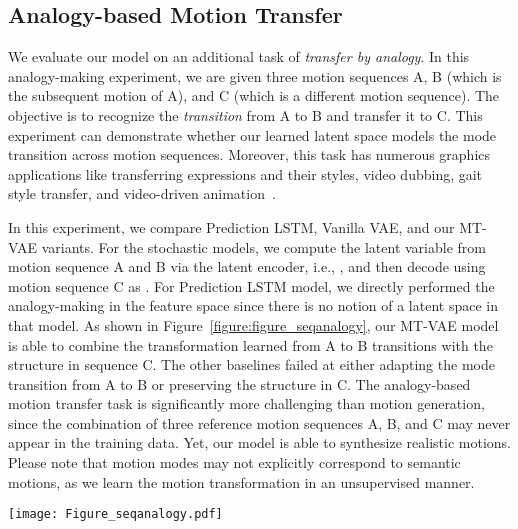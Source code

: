 \documentclass[runningheads]{llncs}
\newcommand{\cutsubsectionup}{\vspace*{-0.1in}}
\newcommand{\cutsubsectiondown}{\vspace*{-0.07in}}
\begin{document}
\cutsubsectionup
\subsection{Analogy-based Motion Transfer}
\cutsubsectiondown

We evaluate our model on an additional task of \emph{transfer by analogy}. 
In this analogy-making experiment, we are given three motion sequences A, B (which is the subsequent motion of A), and C (which is a different motion sequence).
The objective is to recognize the \emph{transition} from A to B and transfer it to C. 
This experiment can demonstrate whether our learned latent space models the mode transition across motion sequences.
Moreover, this task has numerous graphics applications like transferring expressions and their styles, video dubbing, gait style transfer, and video-driven animation~\cite{thies2016face2face}.  

In this experiment, we compare Prediction LSTM, Vanilla VAE, and our MT-VAE variants.
For the stochastic models, we compute the latent variable  from motion sequence A and B via the latent encoder, i.e., , and then decode using motion sequence C as .
For Prediction LSTM model, we directly performed the analogy-making in the feature space  since there is no notion of a latent space in that model.
As shown in Figure~\ref{figure:figure_seqanalogy}, our MT-VAE model is able to combine the transformation learned from A to B transitions with the structure in sequence C. The other baselines failed at either adapting the mode transition from A to B or preserving the structure in C.
The analogy-based motion transfer task is significantly more challenging than motion generation, since the combination of three reference motion sequences A, B, and C may never appear in the training data.
Yet, our model is able to synthesize realistic motions.
Please note that motion modes may not explicitly correspond to semantic motions, as we learn the motion transformation in an unsupervised manner.

\begin{figure*}[t]
\centering
\texttt{[image: Figure\_seqanalogy.pdf]}
\caption{Analogy-based motion transfer.
Given three motion sequences A, B, and C from test set, the objective is to extract the motion mode transition from A to B and then apply it to animate the future starting from sequence C.
For fair comparison, we set the encoder Gaussian distribution parameter  to zero during evaluation.
}
\label{figure:figure_seqanalogy}
\vspace*{-0.2in}
\end{figure*}
\end{document}
